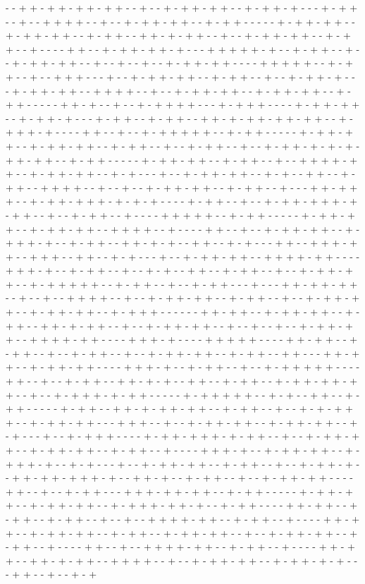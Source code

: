 - - + + - + + - + + - + + - - + - - + - + + - + + - - + - + + - + - - - + - + + - - + - - + + + + - - + - - + - + + - + + - - + - + + - - - - - + - + + - + + - - + - + + - + + - - + - + + - - + + - + - + + - - + - - + - + + - + + - - + - + + - - + - - - - + + - - + - + + - + + - + - - - + + + + + - + - - + - + + - - + - - + - + + - + + - - + - - + - - + - - + - + + - + + - - - - + + + + + - - + - + + - - + - - + + + - - - + - - + - + + - + + - - + - + + - - + - - + - + + - + - - - + - + + - + + - - + + + + - - + - - + - + + - + + - - + - + + - + + - - + - + + - - - - - + + - + - - + - - + - + + + + - - - + - + + + - - - - + - + + - + + - - + - + + - + - - - + - + + - - + - + + - - + + - + - + + - + + - + + - - + - + + + - + - - - - + + - - + - - + - + + + + + - - + - + + - - - - - + - + + - + + - - + - + + - + + - - + - + + - - + - - + - + + - - + - - + - + + - + - + - + - + + - + + - - + - + + - - - - - + - + + - + + - - + - + + - - + - - + + + + - + + - - + - + + - + + - - + - + - - - + - - + - + + - + + - - + - + - - + + - - + - + + - - + + + + - - + - - + - - + - + + - + + - - + - + + - - + - - - + + - + + + - - + - + + - + + + - + - + - + - - - - + - + + - - + - - + - + + - + + + - + - + + - - + - - + - + + - - + - - - - + + + + + - - + - + + - - - - - + - + + - + + - - + - + + - + + - - + + + + - - + - - - - + + - - + - - + - + + - + + - - + - + + + - + - - + - + + - - + + - + - + - - + + - - + - + - - - + + - - + + + - + + - - + + + - - + + - - + - + - - - + - - + - + + - + + - - + + + + - + + - - - - + + + - + - - + - + + - - + - - + - + - - + + - - + - + + - - + - - + - + + - + + - - + - + + + + + - - + - + + - - + - - + - + + - - - + - - - + + - + + - + + - - + - - + - - + + + + - - + - - + - + + - + + - - + - + + - - + - - + - + + - + + - - + - + + - + + - - + - + + + - - - - - - + + - + + - - + - + + - + + - - + - + + - - + + - + - + + - - + - - + - + + - + + - - + - - + - - + - - + - + + - + + - - + + + + - + + - - - - + + + - + - - - - + + + + + - - - - + + - + + - - + - + + - - + - - + - + + - - + - - + - + + - + + - - + - + + - - + + - - - + + - + + - - + - + + - + + - - - - + + + - + - - + - + + - - + - - + - + + + + + - - - - + + - - + - - + - + + - - + + - + - + - - + + - - + - + + - - + - + + - + + - + + - - + - - + - + + + - + - + + - - - - - + - + + + + + - - + - + - - + + - - + - + + - - - - - + - + + - - + + - + - + + - + + - - + - + + - - + - - + - + - + + + - - + - + + - + + - - - + + + - - + - - + - + + - + + - - + - + + - + + - - + - + - - - + - - + - + + + - - - - + - + + - + + + - + - + + - - + - - + - + + - + + - - + - + + - + + - - + - + + - - + - - - - + + + - + - - + - + + - + + - - + - + + + - + - - + - + - - - + - - + - + + - + + - - + - + + - - + - - + - + + - + - - + + - + + - + + + - + - - + + - + - - + - + + - - + - - + - + + - + + - - - - + + - - + - - + - + + - - - + + + - + + - + + - - + - + + - - - - - + - + + - + + - - + - + + - + + - - + - + + + - + + - + - - + - + + - - - - + + - + + - - + - + + - - + - + + - - + - - + - - + + + + - + + - - + - + + - - + - - - - + + - + + - - + - + + - + + - - + - + + - - + - + + - + + - - + - - + - + + - + + - - + - + + - - + - - - - + + - - + - - + + + + - + + - - + - + + - - + - - - - + + - + + - - + + - + - + + - - + + + + - - + - - + - + + - + + - - + - + + - + - + - - - + + - - + - - + - + 